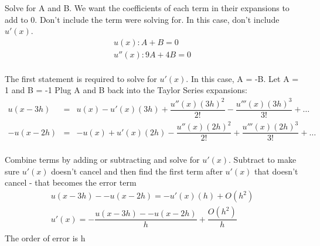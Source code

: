 \documentclass{article}
\def\ds{\displaystyle}
\def\d#1#2{\frac{d#1}{d#2}} %
\newcommand{\bea}{\begin{eqnarray*}}
\newcommand{\eea}{\end{eqnarray*}}
\begin{document}
Solve for A and B. We want the coefficients of each term in their expansions to add to 0. Don't include the term were solving for. In this case, don't include $u'(x)$. \newline
\bea
u(x): A + B = 0 \\
u''(x): 9A + 4B = 0 \\
\eea

The first statement is required to solve for $u'(x)$. In this case, A = -B. Let A = 1 and B = -1
Plug A and B back into the Taylor Series expansions:
\bea
u(x-3h) &=& u(x) - u'(x)(3h) + \dfrac{u''(x)(3h)^2}{2!} -  \dfrac{u'''(x)(3h)^3}{3!}+\ldots  \\
-u(x-2h) &=& -u(x) + u'(x)(2h) - \dfrac{u''(x)(2h)^2}{2!}  +\dfrac{u'''(x)(2h)^3}{3!}+\ldots  \\
\eea

Combine terms by adding or subtracting and solve for $u'(x)$. Subtract to make sure $u'(x)$ doesn't cancel and then find the first term after $u'(x)$ that doesn't cancel - that becomes the error term  \newline
\bea
u(x-3h) - -u(x-2h) = -u'(x)(h) + O(h^2) \\ 
u'(x) = -\dfrac{u(x-3h) - -u(x-2h)}{h} + \dfrac{O(h^2)}{h} \\
\eea
The order of error is h 
\newline

\end{document}
